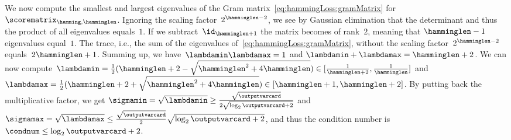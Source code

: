 \documentclass{article}
\begin{document}
%
%
%
%
%
%
%
%
%
%
%
%
%
%
%
%
%
%
%
%
%
%
%
%
%
%
%

We now compute the smallest and largest eigenvalues of the Gram matrix~\eqref{eq:hammingLoss:gramMatrix} for $\scorematrix_{\hamming,\hamminglen}$.
Ignoring the scaling factor~$2^{\hamminglen-2}$, we see by Gaussian elimination that the determinant and thus the product of all eigenvalues equals~$1$.
If we subtract~$\id_{\hamminglen+1}$ the matrix becomes of rank~$2$, meaning that $\hamminglen-1$ eigenvalues equal~$1$.
The trace, i.e., the sum of the eigenvalues of~\eqref{eq:hammingLoss:gramMatrix}, without the scaling factor~$2^{\hamminglen-2}$ equals~$2\hamminglen+1$.
Summing up, we have~$\lambdamin \lambdamax = 1$ and $\lambdamin + \lambdamax = \hamminglen + 2$.
We can now compute~$\lambdamin = \frac12(\hamminglen+2 - \sqrt{\hamminglen^2 + 4\hamminglen}) \in [\frac{1}{\hamminglen+2}, \frac{1}{\hamminglen}]$ and~$\lambdamax = \frac12(\hamminglen+2 + \sqrt{\hamminglen^2 + 4\hamminglen}) \in [\hamminglen+1, \hamminglen+2]$.
By putting back the multiplicative factor, we get 
$
\sigmamin = \sqrt{\lambdamin} \geq \frac{\sqrt{\outputvarcard}}{2\sqrt{\log_2{\outputvarcard}+2}}
$
and
$
\sigmamax = \sqrt{\lambdamax} \leq \frac{\sqrt{\outputvarcard}}{2}\sqrt{\log_2{\outputvarcard}+2}
$,
and thus the condition number is~$\condnum \leq \log_2{\outputvarcard}+2$.

%
%
%
%
%
%
%
%
%
%
%
%
%
%
%
%
%
%
%
%
%
%
%
%
%
%
%
%
%
%
%
%
%
%
%
%
%
%
%
%
%
%
%
%
%
%
%
%
%
%
%
%
%
%
%
%
%
%
%
%
%
%
%
%
%
%
%
%
%
%
%
%
%
%
%
%
%
%
%
%
%
%
%
%
%
%
%
%
%

%
%




%
%
%
%
%

%
%
%
%
%
%
%
%
%
%
%
%
%
%
%
%
%
%
%
%
%
%
%
%
%
%
%
%
%
%
%
%
%
%
%
%
%
%
%
%
%
%
%
%
%
%
%
%
%
%
%
%
%
%
%
%
%
%
%
%
%
%
%
%
%
%
%
%
%
%
%
%
%
%
%
%
%
%
%
%
%
%
%
%
%
%
%
%
%
%
%
%
%
%
%
%
%
%
%
%
%
%
%

%
%
%
%
%
%
%
%
%
%
%
%
%
%
%
%
%
%
%
%
%
%
%
%
%
%
%
%
%
%
%
%
%
%
%
%
%
%
%
%
%

%
%
%
%
%
%
%
%
%
%
%
%
%
%
%
%
%
%
%
%
%
%
%
%
%
%
%
%
%

%
%
%
%
%
%
%
%
%
%
%
%
%
%
%
%
%
%
%
%
%
%
%
%
%
%
%
%
%
%
%
%
%
%
%
%
%
%
%
%
%
%
%
%
%
%
%
%
%
%
%
%
%
%
%
%
%
%
%
%
%
%
%
%
%
%
%
%
%
%
%
%
%
%
%
%
%
%
%
%
%
%
%
%
%
%
%
%
%
%
%
%
%
%
%
%
%
%
%
%
%
%
%
%
%
%
%
%
%
%
%
%
%
%
%
%
%
%
%
%
%
%
%
%
%
%
%
%
%
%
%
%
%
%
%
%
%
%
%
%
%
%
%
%
%
%
%
%
%
%
%
%
%
%
%
%
%
%
%
%
%
%
%
%
%
%
%
%
%
%
%
%
%
%
%
%
%
%
%
%
%
%
%
%
%
%
%
%
%
%
%
%
%
%
%
%
%
%
%
%
%
%
%


%
%
%
%
%
%
%
%
%
%
%
%
%
%
%
%
%
%
%
%
%
%
%
%
%
%
%
%
%
%
%
%
%
%
%
%
%
%
%
%
%
%
%
%
%
%
%
%
%
%
%
%

%
%
%
%
%
%
%
%
%
%
%
%
%
%
%
%
%
%
%
%
%
%
%
%
%

%
%
%
%
%
%
%
%
%
%
%
\end{document}
